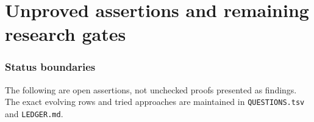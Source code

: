 \documentclass[11pt,a4paper]{article}
\begin{document}





























\part{Unproved assertions and remaining research gates}
\section{Status boundaries}
The following are open assertions, not unchecked proofs presented
as findings. The exact evolving rows and tried approaches are
maintained in \texttt{QUESTIONS.tsv} and \texttt{LEDGER.md}.
\end{document}
